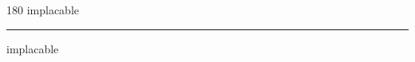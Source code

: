 
\begin{frame}
\begin{center}
\begin{turn}{180}
{\fontsize{2.5cm}{1em}\selectfont implacable}
\end{turn}
\vspace{1em}\par  
\hrule
\vspace{1em}\par  
{\fontsize{2.5cm}{1em}\selectfont implacable}
\end{center}
\end{frame}
